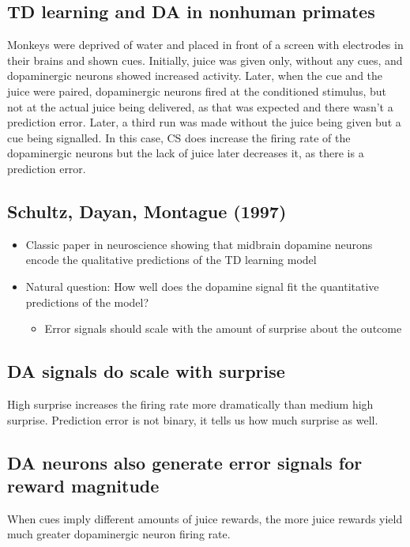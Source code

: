 \subsection{TD learning and DA in nonhuman primates}
Monkeys were deprived of water and placed in front of a screen with electrodes in their brains and shown cues. Initially, juice was given only, without any cues, and dopaminergic neurons showed increased activity. Later, when the cue and the juice were paired, dopaminergic neurons fired at the conditioned stimulus, but not at the actual juice being delivered, as that was expected and there wasn't a prediction error. Later, a third run was made without the juice being given but a cue being signalled. In this case, CS does increase the firing rate of the dopaminergic neurons but the lack of juice later decreases it, as there is a prediction error.

\subsection{Schultz, Dayan, Montague (1997)}

\begin{itemize}
    \item Classic paper in neuroscience showing that midbrain dopamine neurons encode the qualitative predictions of the TD learning model
    \item Natural question: How well does the dopamine signal fit the quantitative predictions of the model?
    \begin{itemize}
        \item Error signals should scale with the amount of surprise about the outcome
    \end{itemize}
\end{itemize}

\subsection{DA signals do scale with surprise}
High surprise increases the firing rate more dramatically than medium high surprise. Prediction error is not binary, it tells us how much surprise as well.
\subsection{DA neurons also generate error signals for reward magnitude}
When cues imply different amounts of juice rewards, the more juice rewards yield much greater dopaminergic neuron firing rate.

